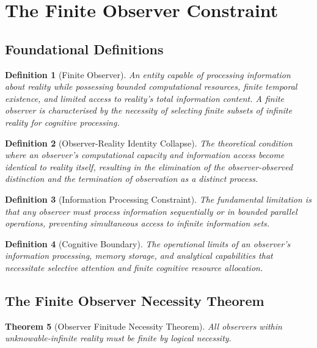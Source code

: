 \documentclass[12pt,a4paper]{article}
\newtheorem{theorem}{Theorem}[section]
\newtheorem{definition}[theorem]{Definition}
\begin{document}
\section{The Finite Observer Constraint}

\subsection{Foundational Definitions}

\begin{definition}[Finite Observer]
An entity capable of processing information about reality while possessing bounded computational resources, finite temporal existence, and limited access to reality's total information content. A finite observer is characterised by the necessity of selecting finite subsets of infinite reality for cognitive processing.
\end{definition}

\begin{definition}[Observer-Reality Identity Collapse]
The theoretical condition where an observer's computational capacity and information access become identical to reality itself, resulting in the elimination of the observer-observed distinction and the termination of observation as a distinct process.
\end{definition}

\begin{definition}[Information Processing Constraint]
The fundamental limitation is that any observer must process information sequentially or in bounded parallel operations, preventing simultaneous access to infinite information sets.
\end{definition}

\begin{definition}[Cognitive Boundary]
The operational limits of an observer's information processing, memory storage, and analytical capabilities that necessitate selective attention and finite cognitive resource allocation.
\end{definition}

\subsection{The Finite Observer Necessity Theorem}

\begin{theorem}[Observer Finitude Necessity Theorem]
All observers within unknowable-infinite reality must be finite by logical necessity.
\end{theorem}
\end{document}
